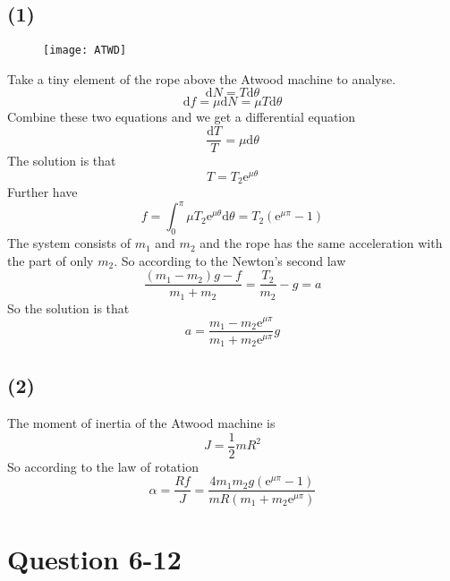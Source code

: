 \documentclass[12pt,a4paper]{article}%
\begin{document}
	\subsection*{(1)}
	\begin{figure}[H]
		\centering
		\texttt{[image: ATWD]}
		\caption*{}
		\label{fig:atwd}
	\end{figure}
	\noindent Take a tiny element of the rope above the Atwood machine to analyse.
	\begin{equation}
		\mathrm{d}N=T\mathrm{d}\theta 
	\end{equation}
	\begin{equation}
		\mathrm{d}f=\mu \mathrm{d}N=\mu T\mathrm{d}\theta 
	\end{equation}
	Combine these two equations and we get a differential equation
	\begin{equation}
		\frac{\mathrm{d}T}{T}=\mu \mathrm{d}\theta 
	\end{equation}
	The solution is that
	\begin{equation}
		T=T_2\mathrm{e}^{\mu \theta}
	\end{equation}
	Further have
	\begin{equation}
		f=\int_0^{\pi}{\mu T_2\mathrm{e}^{\mu \theta}\mathrm{d}\theta}=T_2(\mathrm{e}^{\mu\pi}-1)
	\end{equation}
	The system consists of $m_1$ and $m_2$ and the rope has the same acceleration with the part of only $m_2$. So according to the Newton's second law
	\begin{equation}
		\frac{\left( m_1-m_2 \right) g-f}{m_1+m_2}=\frac{T_2}{m_2}-g=a
	\end{equation}
	So the solution is that
	\begin{equation*}
		a=\frac{m_1-m_2\mathrm{e}^{\mu\pi}}{m_1+m_2\mathrm{e}^{\mu\pi}}g
	\end{equation*}
	\subsection*{(2)}
	\noindent The moment of inertia of the Atwood machine is
	\begin{equation}
		J=\frac{1}{2}mR^2
	\end{equation}
	So according to the law of rotation
	\begin{equation*}
		\alpha=\frac{Rf}{J}=\frac{4m_1m_2g(\mathrm{e}^{\mu\pi}-1)}{mR(m_1+m_2\mathrm{e}^{\mu\pi})}
	\end{equation*}
	\section{Question 6-12}
\end{document}

